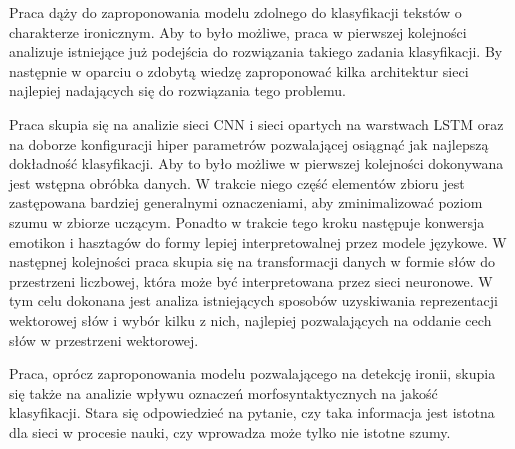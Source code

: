 
Praca dąży do zaproponowania modelu zdolnego do klasyfikacji tekstów o charakterze ironicznym. Aby to było możliwe, praca w pierwszej kolejności analizuje istniejące już podejścia do rozwiązania takiego zadania klasyfikacji. By następnie w oparciu o zdobytą wiedzę zaproponować kilka architektur sieci najlepiej nadających się do rozwiązania tego problemu. 

Praca skupia się na analizie sieci CNN i sieci opartych na warstwach LSTM oraz na doborze konfiguracji hiper parametrów pozwalającej osiągnąć jak najlepszą dokładność klasyfikacji. Aby to było możliwe w pierwszej kolejności dokonywana jest wstępna obróbka danych. W trakcie niego część elementów zbioru jest zastępowana bardziej generalnymi oznaczeniami, aby zminimalizować poziom szumu w zbiorze uczącym. Ponadto w trakcie tego kroku następuje konwersja emotikon i hasztagów do formy lepiej interpretowalnej przez modele językowe. W następnej kolejności praca skupia się na transformacji danych w formie słów do przestrzeni liczbowej, która może być interpretowana przez sieci neuronowe. W tym celu dokonana jest analiza istniejących sposobów uzyskiwania reprezentacji wektorowej słów i wybór kilku z nich, najlepiej pozwalających na oddanie cech słów w przestrzeni wektorowej. 

Praca, oprócz zaproponowania modelu pozwalającego na detekcję ironii, skupia się także na analizie wpływu oznaczeń morfosyntaktycznych na jakość klasyfikacji. Stara się odpowiedzieć na pytanie, czy taka informacja jest istotna dla sieci w procesie nauki, czy wprowadza może tylko nie istotne szumy. 



